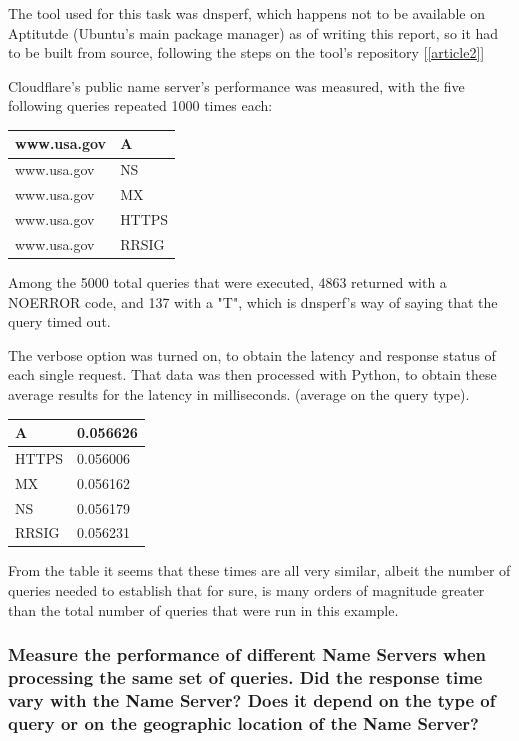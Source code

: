 \documentclass[a4paper,10pt]{article}
\begin{document}
The tool used for this task was dnsperf, which happens not to be available on Aptitutde (Ubuntu's main package manager) as of writing this report, so it had to be built from source, following the steps on the tool's repository [\ref{article2}]

Cloudflare's public name server's performance was measured, with the five following queries repeated 1000 times each:

\begin{table}[h!]
\centering
\begin{tabular}{|l|l|}
\hline
www.usa.gov & A     \\ \hline
www.usa.gov & NS    \\ \hline
www.usa.gov & MX    \\ \hline
www.usa.gov & HTTPS \\ \hline
www.usa.gov & RRSIG \\ \hline
\end{tabular}
\end{table}

Among the 5000 total queries that were executed,  4863 returned with a NOERROR code, and 137 with a "T", which is dnsperf's way of saying that the query timed out.

The verbose option was turned on, to obtain the latency and response status of each single request. That data was then processed with Python, to obtain these average results for the latency in milliseconds. (average on the query type).

\begin{table}[h!]
\centering
\begin{tabular}{|l|l|}
\hline
A     & 0.056626 \\ \hline
HTTPS & 0.056006 \\ \hline
MX    & 0.056162 \\ \hline
NS    & 0.056179 \\ \hline
RRSIG & 0.056231 \\ \hline
\end{tabular}
\end{table}


From the table it seems that these times are all very similar, albeit the number of queries needed to establish that for sure, is many orders of magnitude greater than the total number of queries that were run in this example.


\subsubsection{Measure the performance of different Name Servers when processing the same
set of queries. Did the response time vary with the Name Server? Does it depend
on the type of query or on the geographic location of the Name Server?}
\end{document}
